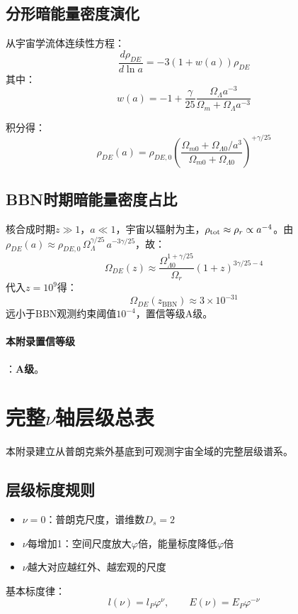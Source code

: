 \documentclass[12pt,a4paper,twocolumn]{article}
\renewcommand{\phi}{\varphi}
\begin{document}
\subsection{分形暗能量密度演化}
从宇宙学流体连续性方程：
\[
\frac{d\rho_{DE}}{d\ln a} = -3(1+w(a))\rho_{DE}
\]
其中：
\[
w(a) = -1 + \frac{\gamma}{25} \frac{\Omega_\Lambda a^{-3}}{\Omega_m + \Omega_\Lambda a^{-3}}
\]

积分得：
\[
\rho_{DE}(a) = \rho_{DE,0} \left( \frac{\Omega_{m0} + \Omega_{\Lambda0}/a^3}{\Omega_{m0} + \Omega_{\Lambda0}} \right)^{+\gamma/25}
\]

\subsection{BBN时期暗能量密度占比}
核合成时期$z\gg1$，$a\ll1$，宇宙以辐射为主，$\rho_{\rm tot}\approx\rho_r\propto a^{-4}$。由$\rho_{DE}(a)\approx\rho_{DE,0}\,\Omega_\Lambda^{\gamma/25}\,a^{-3\gamma/25}$，故：
\[
\Omega_{DE}(z) \approx \frac{\Omega_{\Lambda0}^{1+\gamma/25}}{\Omega_r} (1+z)^{3\gamma/25-4}
\]
代入$z=10^9$得：
\[
\Omega_{DE}(z_{\text{BBN}}) \approx 3\times 10^{-31}
\]
远小于BBN观测约束阈值$10^{-4}$，置信等级A级。

\paragraph{本附录置信等级}：\textbf{A级}。

\section{完整$\nu$轴层级总表}
\label{app:nu_axis}

本附录建立从普朗克紫外基底到可观测宇宙全域的完整层级谱系。

\subsection{层级标度规则}
\begin{itemize}
\item $\nu=0$：普朗克尺度，谱维数$D_s=2$
\item $\nu$每增加1：空间尺度放大$\phi$倍，能量标度降低$\phi$倍
\item $\nu$越大对应越红外、越宏观的尺度
\end{itemize}

基本标度律：
\[
l(\nu) = l_P \phi^\nu,\qquad E(\nu) = E_P \phi^{-\nu}
\]
\end{document}
